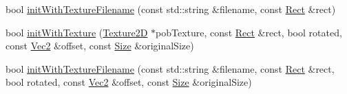 \begin{DoxyCompactItemize}
\item 
bool \hyperlink{classSpriteFrame_a148345ef7f3bb972f829c8345d8eafe6}{init\+With\+Texture\+Filename} (const std\+::string \&filename, const \hyperlink{classRect}{Rect} \&rect)
\item 
bool \hyperlink{classSpriteFrame_a34c705b9057c0fac4d6697a235c67df8}{init\+With\+Texture} (\hyperlink{classTexture2D}{Texture2D} $\ast$pob\+Texture, const \hyperlink{classRect}{Rect} \&rect, bool rotated, const \hyperlink{classVec2}{Vec2} \&offset, const \hyperlink{classSize}{Size} \&original\+Size)
\item 
bool \hyperlink{classSpriteFrame_ad1b6afd243eadab8a2f2128561645133}{init\+With\+Texture\+Filename} (const std\+::string \&filename, const \hyperlink{classRect}{Rect} \&rect, bool rotated, const \hyperlink{classVec2}{Vec2} \&offset, const \hyperlink{classSize}{Size} \&original\+Size)
\end{DoxyCompactItemize}

